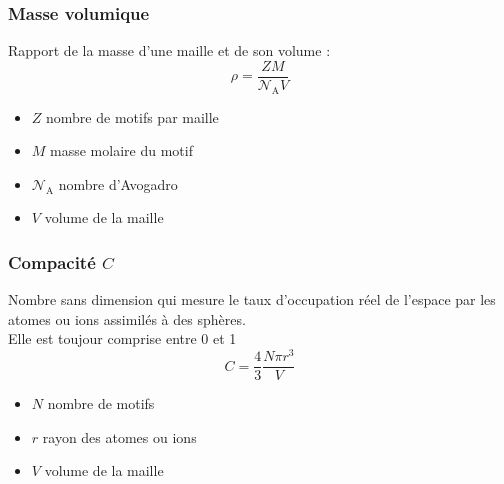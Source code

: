 \subsubsection{Masse volumique}
\begin{defi}
    Rapport de la masse d'une maille et de son volume :
    \begin{equation}
        \rho = \frac{ZM}{\mathcal{N}_\text{A}V}\label{eq:masse_volumique}
    \end{equation}
    \begin{itemize}
        \item $Z$ nombre de motifs par maille
        \item $M$ masse molaire du motif
        \item $\mathcal{N}_\text{A}$ nombre d'Avogadro
        \item $V$ volume de la maille
    \end{itemize}
\end{defi}

\subsubsection{Compacité $C$}
\begin{defi}
    Nombre sans dimension qui mesure le taux d'occupation réel de l'espace
    par les atomes ou ions assimilés à des sphères.\\
    Elle est toujour comprise entre 0 et 1
    \begin{equation}
        C = \frac{4}{3}\frac{N \pi r^3}{V} \label{eq:comp}
    \end{equation}
    \begin{itemize}
        \item $N$ nombre de motifs
        \item $r$ rayon des atomes ou ions
        \item $V$ volume de la maille
    \end{itemize}
\end{defi}

